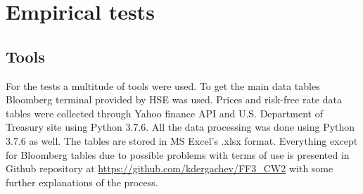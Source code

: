 \documentclass[a4paper,12pt]{article} %
\begin{document}
	\section{Empirical tests}
	\subsection{Tools}
	For the tests a multitude of tools were used. To get the main data tables Bloomberg terminal provided by HSE was used. Prices and risk-free rate data tables were collected through Yahoo finance API and U.S. Department of Treasury site using Python 3.7.6. All the data processing was done using Python 3.7.6 as well. The tables are stored in MS Excel's .xlsx format. Everything except for Bloomberg tables due to possible problems with terms of use is presented in Github repository at \url{https://github.com/kdergachev/FF3_CW2} with some further explanations of the process.
\end{document}
